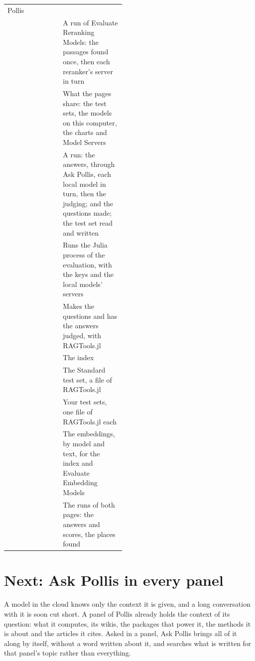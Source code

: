 \begin{center}
\begin{tabularx}{\linewidth}{@{}p{0.47\linewidth}L@{}}
  Pollis\\
 & A run of Evaluate Reranking Models: the passages found once, then
  each reranker's server in turn\\
 & What the pages share: the test sets, the models on this computer, the
  charts and Model Servers\\
 & A run: the answers, through Ask Pollis, each local model in turn, then
  the judging; and the questions made; the test set read and written\\
 & Runs the Julia process of the evaluation, with the keys
  and the local models' servers\\
 & Makes the questions and has the answers judged, with RAGTools.jl\\
 & The index\\
 & The Standard test set, a file of RAGTools.jl\\
 & Your test sets, one file of RAGTools.jl each\\
 & The embeddings, by model and text, for the index and Evaluate
  Embedding Models\\
 & The runs of both pages: the answers and scores, the places found\\
\bottomrule
\end{tabularx}
\end{center}

\section{Next: Ask Pollis in every panel}\label{sec:panels}

A model in the cloud knows only the context it is given, and a long conversation with it is soon cut short. A panel
of Pollis already holds the context of its question: what it computes, its wikis, the packages that power it, the
methods it is about and the articles it cites. Asked in a panel, Ask Pollis brings all of it along by itself, without a
word written about it, and searches what is written for that panel's topic rather than everything.

